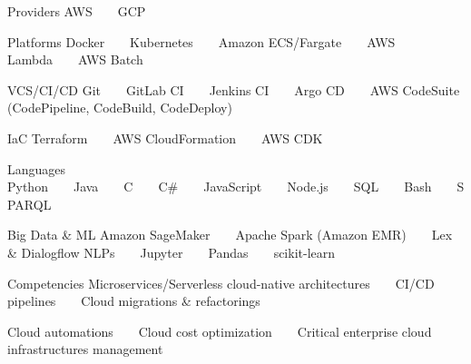 

\begin{cvskills}
	
\cvskill
{Providers} %
{AWS~~\textbullet~~GCP} %

\cvskill
{Platforms} %
{Docker~~\textbullet~~Kubernetes~~\textbullet~~Amazon ECS/Fargate~~\textbullet~~AWS Lambda~~\textbullet~~AWS Batch} %


\cvskill
{VCS/CI/CD}%
{Git~~\textbullet~~GitLab CI~~\textbullet~~Jenkins CI~~\textbullet~~Argo CD~~\textbullet~~AWS CodeSuite (CodePipeline, CodeBuild, CodeDeploy)} %


\cvskill
{IaC} %
{Terraform~~\textbullet~~AWS CloudFormation~~\textbullet~~AWS CDK} %


  \cvskill
    {Languages} %
    {Python~~\textbullet~~Java~~\textbullet~~C~~\textbullet~~C\#~~\textbullet~~JavaScript~~\textbullet~~Node.js~~\textbullet~~SQL~~\textbullet~~Bash~~\textbullet~~SPARQL} %

\cvskill
{Big Data \& ML} %
{Amazon SageMaker~~\textbullet~~Apache Spark (Amazon EMR)~~\textbullet~~Lex \& Dialogflow NLPs~~\textbullet~~Jupyter~~\textbullet~~Pandas~~\textbullet~~scikit-learn} %

  \cvskill
{Competencies} %
{Microservices/Serverless cloud-native architectures~~\textbullet~~CI/CD pipelines~~\textbullet~~Cloud migrations \& refactorings~~\textbullet~~}

  \cvskill
  {}
  {Cloud automations~~\textbullet~~Cloud cost optimization~~\textbullet~~Critical enterprise cloud infrastructures management~~\textbullet~~} %


\end{cvskills}

